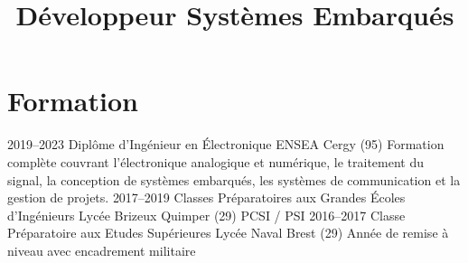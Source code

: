 \documentclass[11pt,a4paper]{moderncv}
\title{Développeur Systèmes Embarqués}
\begin{document}
\makecvtitle

\section{Formation}
    \cventry
        {2019--2023}
        {Diplôme d'Ingénieur en Électronique}
        {ENSEA}
        {Cergy (95)}
        {}
        {Formation complète couvrant l'électronique analogique et numérique, le traitement du signal, la conception de systèmes embarqués, les systèmes de communication et la gestion de projets.}
    \cventry
        {2017--2019}
        {Classes Préparatoires aux Grandes Écoles d'Ingénieurs}
        {Lycée Brizeux}
        {Quimper (29)}
        {}
        {PCSI / PSI}   
    \cventry
        {2016--2017}
        {Classe Préparatoire aux Etudes Supérieures}
        {Lycée Naval}
        {Brest (29)}
        {}
        {Année de remise à niveau avec encadrement militaire}  

        
\end{document}
